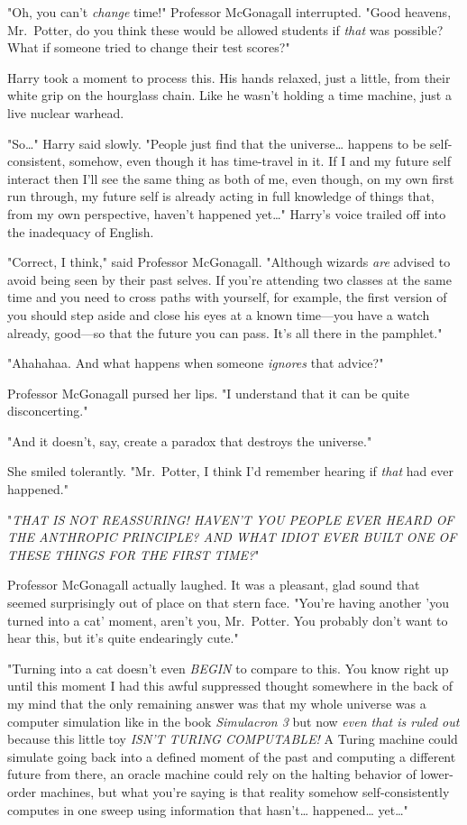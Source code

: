 "Oh, you can't \emph{change} time!" Professor McGonagall interrupted. "Good heavens, Mr.~Potter, do you think these would be allowed students if \emph{that} was possible? What if someone tried to change their test scores?"

Harry took a moment to process this. His hands relaxed, just a little, from their white grip on the hourglass chain. Like he wasn't holding a time machine, just a live nuclear warhead.

"So{\ldots}" Harry said slowly. "People just find that the universe{\ldots} happens to be self-consistent, somehow, even though it has time-travel in it. If I and my future self interact then I'll see the same thing as both of me, even though, on my own first run through, my future self is already acting in full knowledge of things that, from my own perspective, haven't happened yet{\ldots}" Harry's voice trailed off into the inadequacy of English.

"Correct, I think," said Professor McGonagall. "Although wizards \emph{are} advised to avoid being seen by their past selves. If you're attending two classes at the same time and you need to cross paths with yourself, for example, the first version of you should step aside and close his eyes at a known time---you have a watch already, good---so that the future you can pass. It's all there in the pamphlet."

"Ahahahaa. And what happens when someone \emph{ignores} that advice?"

Professor McGonagall pursed her lips. "I understand that it can be quite disconcerting."

"And it doesn't, say, create a paradox that destroys the universe."

She smiled tolerantly. "Mr.~Potter, I think I'd remember hearing if \emph{that} had ever happened."

"\emph{THAT IS NOT REASSURING! HAVEN'T YOU PEOPLE EVER HEARD OF THE ANTHROPIC PRINCIPLE? AND WHAT IDIOT EVER BUILT ONE OF THESE THINGS FOR THE FIRST TIME?}"

Professor McGonagall actually laughed. It was a pleasant, glad sound that seemed surprisingly out of place on that stern face. "You're having another 'you turned into a cat' moment, aren't you, Mr.~Potter. You probably don't want to hear this, but it's quite endearingly cute."

"Turning into a cat doesn't even \emph{BEGIN} to compare to this. You know right up until this moment I had this awful suppressed thought somewhere in the back of my mind that the only remaining answer was that my whole universe was a computer simulation like in the book \emph{Simulacron 3} but now \emph{even that is ruled out} because this little toy \emph{ISN'T TURING COMPUTABLE!} A Turing machine could simulate going back into a defined moment of the past and computing a different future from there, an oracle machine could rely on the halting behavior of lower-order machines, but what you're saying is that reality somehow self-consistently computes in one sweep using information that hasn't{\ldots} happened{\ldots} yet{\ldots}"

